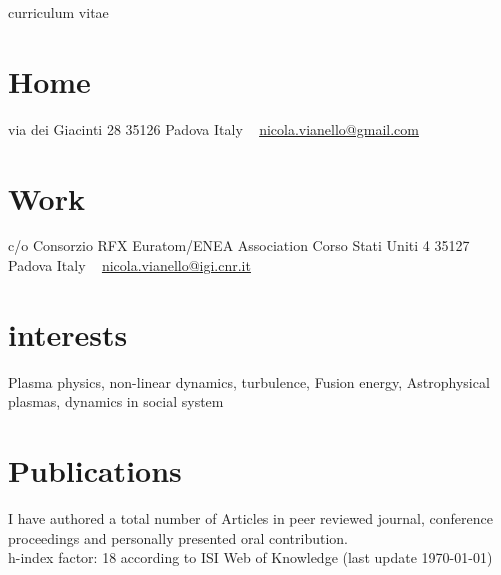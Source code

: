 \documentclass[]{nicola-cv}
\begin{document}
       {curriculum vitae}


\begin{aside}
  \section{Home}
    via dei Giacinti 28
    35126 Padova
    Italy
    ~
    \href{mailto:nicola.vianello@gmail.com}{nicola.vianello@gmail.com}
  \section{Work}
    c/o Consorzio RFX
    Euratom/ENEA Association
    Corso Stati Uniti 4
    35127 Padova
    Italy
    ~
    \href{mailto:nicola.vianello@igi.cnr.it}{nicola.vianello@igi.cnr.it}
\end{aside}

\section{interests}

Plasma physics, non-linear dynamics, turbulence, Fusion energy,
Astrophysical plasmas, dynamics in social system



























\section{Publications}
\nocite{*}
I have authored a total number of \printbibliography[env=counter,
 heading=counter, type=article] Articles in peer reviewed journal,  
 \printbibliography[env=counter, heading=counter, type=inproceedings]
 conference proceedings and personally presented
 \printbibliography[env=counter, heading=counter, type=misc] oral
 contribution. \\
h-index factor: 18 according to ISI Web of Knowledge (last update \today)
\end{document}
